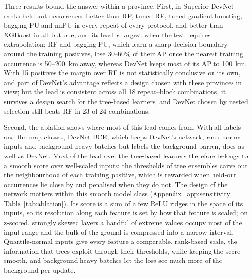 \documentclass[pdflatex,sn-apa]{sn-jnl}
\begin{document}
Three results bound the answer within a province. First, in Superior DevNet ranks held-out occurrences better than RF, tuned RF, tuned gradient boosting, bagging-PU and nnPU in every repeat of every protocol, and better than XGBoost in all but one, and its lead is largest when the test requires extrapolation: RF and bagging-PU, which learn a sharp decision boundary around the training positives, lose 30--60\% of their AP once the nearest training occurrence is 50--200~km away, whereas DevNet keeps most of its AP to 100~km. With 15 positives the margin over RF is not statistically conclusive on its own, and part of DevNet's advantage reflects a design chosen with these provinces in view; but the lead is consistent across all 18 repeat--block combinations, it survives a design search for the tree-based learners, and DevNet chosen by nested selection still beats RF in 23 of 24 combinations.

Second, the ablation shows where most of this lead comes from. With all labels and the map classes, DevNet-BCE, which keeps DevNet's network, rank-normal inputs and background-heavy batches but labels the background barren, does as well as DevNet. Most of the lead over the tree-based learners therefore belongs to a smooth score over well-scaled inputs: the thresholds of tree ensembles carve out the neighbourhood of each training positive, which is rewarded when held-out occurrences lie close by and penalised when they do not. The design of the network matters within this smooth model class (Appendix~\ref{app:sensitivity}, Table~\ref{tab:ablation}). Its score is a sum of a few ReLU ridges in the space of its inputs, so its resolution along each feature is set by how that feature is scaled; on z-scored, strongly skewed layers a handful of extreme values occupy most of the input range and the bulk of the ground is compressed into a narrow interval. Quantile-normal inputs give every feature a comparable, rank-based scale, the information that trees exploit through their thresholds, while keeping the score smooth, and background-heavy batches let the loss see much more of the background per update.
\end{document}
